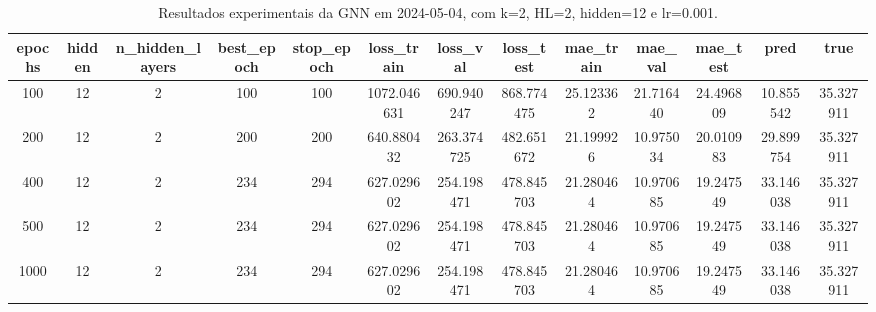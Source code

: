 \begin{table}[h]
\centering
\caption{Resultados experimentais da GNN em 2024-05-04, com k=2, HL=2, hidden=12 e lr=0.001.}
\label{tab:gnn_results_k2_hl2_h12_d20240504}
\begin{tabular}{ccccccccccccc}
\toprule
epochs & hidden & n\_hidden\_layers & best\_epoch & stop\_epoch & loss\_train & loss\_val & loss\_test & mae\_train & mae\_val & mae\_test & pred & true \\
\midrule
100 & 12 & 2 & 100 & 100 & 1072.046631 & 690.940247 & 868.774475 & 25.123362 & 21.716440 & 24.496809 & 10.855542 & 35.327911 \\
200 & 12 & 2 & 200 & 200 & 640.880432 & 263.374725 & 482.651672 & 21.199926 & 10.975034 & 20.010983 & 29.899754 & 35.327911 \\
400 & 12 & 2 & 234 & 294 & 627.029602 & 254.198471 & 478.845703 & 21.280464 & 10.970685 & 19.247549 & 33.146038 & 35.327911 \\
500 & 12 & 2 & 234 & 294 & 627.029602 & 254.198471 & 478.845703 & 21.280464 & 10.970685 & 19.247549 & 33.146038 & 35.327911 \\
1000 & 12 & 2 & 234 & 294 & 627.029602 & 254.198471 & 478.845703 & 21.280464 & 10.970685 & 19.247549 & 33.146038 & 35.327911 \\
\bottomrule
\end{tabular}
\end{table}
